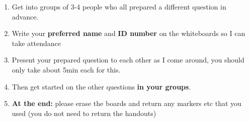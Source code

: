 \documentclass{beamer}
\begin{document}
\begin{frame}{\inserttitle}
\begin{enumerate}
  \item Get into groups of 3-4 people who all prepared a different question in advance.
  \item Write your \textbf{preferred name} and \textbf{ID number} on the whiteboards so I can take attendance
  \item Present your prepared question to each other as I come around, you should only take about 5min each for this.
  \item Then get started on the other questions \textbf{in your groups}.
  \item \textbf{At the end:} please erase the boards and return any markers etc that you used (you do not need to return the handouts)
\end{enumerate}
\end{frame}
\end{document}
